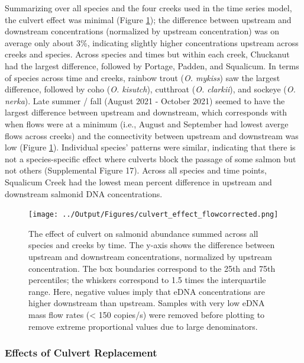 \documentclass[
]{article}
\begin{document}
Summarizing over all species and the four creeks used in the time series
model, the culvert effect was minimal (Figure \ref{fig:culverts}); the
difference between upstream and downstream concentrations (normalized by
upstream concentration) was on average only about 3\%, indicating
slightly higher concentrations upstream across creeks and species.
Across species and times but within each creek, Chuckanut had the
largest difference, followed by Portage, Padden, and Squalicum. In terms
of species across time and creeks, rainbow trout (\emph{O. mykiss}) saw
the largest difference, followed by coho (\emph{O. kisutch}), cutthroat
(\emph{O. clarkii}), and sockeye (\emph{O. nerka}). Late summer / fall
(August 2021 - October 2021) seemed to have the largest difference
between upstream and downstream, which corresponds with when flows were
at a minimum (i.e., August and September had lowest averge flows across
creeks) and the connectivity between upstream and downstream was low
(Figure \ref{fig:culverts}). Individual species' patterns were similar,
indicating that there is not a species-specific effect where culverts
block the passage of some salmon but not others (Supplemental Figure
17). Across all species and time points, Squalicum Creek had the lowest
mean percent difference in upstream and downstream salmonid DNA
concentrations.

\begin{figure}
\centering
\texttt{[image: ../Output/Figures/culvert\_effect\_flowcorrected.png]}
\caption{The effect of culvert on salmonid abundance summed across all
species and creeks by time. The y-axis shows the difference between
upstream and downstream concentrations, normalized by upstream
concentration. The box boundaries correspond to the 25th and 75th
percentiles; the whiskers correspond to 1.5 times the interquartile
range. Here, negative values imply that eDNA concentrations are higher
downstream than upstream. Samples with very low eDNA mass flow rates
(\textless{} 150 copies/s) were removed before plotting to remove
extreme proportional values due to large
denominators.\label{fig:culverts}}
\end{figure}

\hypertarget{effects-of-culvert-replacement}{%
\subsubsection{Effects of Culvert
Replacement}\label{effects-of-culvert-replacement}}
\end{document}
